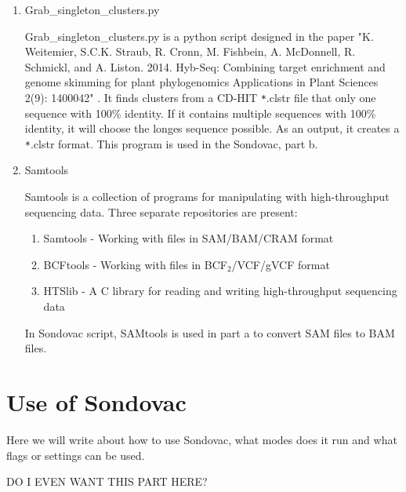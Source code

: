 \begin{enumerate}

\item Grab\_singleton\_clusters.py

Grab\_singleton\_clusters.py is a python script designed in the paper "K. Weitemier, S.C.K. Straub, R. Cronn, M. Fishbein, A. McDonnell, R. Schmickl, and A. Liston. 2014. Hyb-Seq: Combining target enrichment and genome skimming for plant phylogenomics Applications in Plant Sciences 2(9): 1400042" \cite{weitemier2014hyb}. It finds clusters from a CD-HIT \verb_*_.clstr file that only one sequence with 100\% identity. If it contains multiple sequences with 100\% identity, it will choose the longes sequence possible. As an output, it creates a \verb_*_.clstr format. 
\cite{grabsingletonclusters}
This program is used in the Sondovac, part b. 

\item Samtools

Samtools is a collection of programs for manipulating with high-throughput sequencing data. Three separate repositories are present: 
\begin{enumerate}
\item Samtools - Working with files in SAM/BAM/CRAM format
\item BCFtools - Working with files in BCF$_2$/VCF/gVCF format
\item HTSlib - A C library for reading and writing high-throughput sequencing data
\end{enumerate}
\cite{samtools}

In Sondovac script, SAMtools is used in part a to convert SAM files to BAM files. 







\end{enumerate}

\section{Use of Sondovac}
Here we will write about how to use Sondovac, what modes does it run and what flags or settings can be used.

DO I EVEN WANT THIS PART HERE? 



